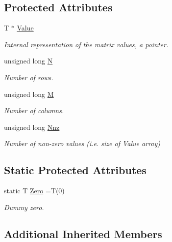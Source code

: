 \subsection*{Protected Attributes}
\begin{DoxyCompactItemize}
\item 
T $\ast$ \hyperlink{classoomph_1_1SparseMatrix_a55b53c70fe3906a65d0f84c429e963b1}{Value}
\begin{DoxyCompactList}\small\item\em Internal representation of the matrix values, a pointer. \end{DoxyCompactList}\item 
unsigned long \hyperlink{classoomph_1_1SparseMatrix_a8f15f962605f52fc75e8679efc6c8677}{N}
\begin{DoxyCompactList}\small\item\em Number of rows. \end{DoxyCompactList}\item 
unsigned long \hyperlink{classoomph_1_1SparseMatrix_ae558ff039363bd2aa163525442090508}{M}
\begin{DoxyCompactList}\small\item\em Number of columns. \end{DoxyCompactList}\item 
unsigned long \hyperlink{classoomph_1_1SparseMatrix_a1459cbaeec275fe95ba45f7d843b26a5}{Nnz}
\begin{DoxyCompactList}\small\item\em Number of non-\/zero values (i.\+e. size of Value array) \end{DoxyCompactList}\end{DoxyCompactItemize}
\subsection*{Static Protected Attributes}
\begin{DoxyCompactItemize}
\item 
static T \hyperlink{classoomph_1_1SparseMatrix_a71a5ae159c26f93c314c839f4db6eaaf}{Zero} =T(0)
\begin{DoxyCompactList}\small\item\em Dummy zero. \end{DoxyCompactList}\end{DoxyCompactItemize}
\subsection*{Additional Inherited Members}


